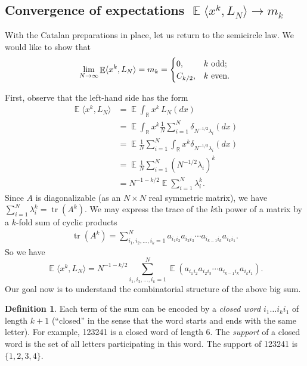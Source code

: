 \documentclass[letterpaper,11pt,oneside,reqno]{amsart}
\numberwithin{equation}{section}
\DeclareMathOperator{\EE}{\mathbb{E}}
\theoremstyle{definition}
\newtheorem{definition}[proposition]{Definition}
\begin{document}


\subsection{Convergence of expectations $\EE \langle x^k,L_N\rangle \to m_k$} %
\label{sub:convergence_of_expectations_}

With the Catalan preparations in place, let us return to the semicircle law. 
We would like to show that 
\begin{align}\label{desired_convergence_of_averages_in_WSCL}
	\lim_{N\to\infty}\EE \langle x^k,L_N\rangle = m_k=\begin{cases}
		0,&\textnormal{$k$ odd};\\
		C_{k/2},&\textnormal{$k$ even}.
	\end{cases}
\end{align}

First, observe that the left-hand side has the form
\begin{equation*}
\begin{split}
\EE\langle x^k,L_N\rangle&=\EE\int_{\mathbb R}x^k\,L_N(dx)\\
&=\EE\int_{\mathbb R}x^k\frac{1}{N}\sum_{i=1}^N \delta_{N^{-1/2}\lambda_i}(dx)\\
&=\EE\frac{1}{N}\sum_{i=1}^N\int_{\mathbb R}x^k\delta_{N^{-1/2}\lambda_i}(dx)\\
&=\EE\frac{1}{N}\sum_{i=1}^N (N^{-1/2}\lambda_i)^k\\
&= N^{-1-k/2}\EE \sum_{i=1}^N \lambda_i^k.
\end{split}
\end{equation*}
Since $A$ is diagonalizable (as an $N\times N$ real symmetric matrix), we have $\sum_{i=1}^N \lambda_i^k=\mathop{\mathrm{tr}}(A^k)$. We may express the trace of the $k$th power of a matrix by a $k$-fold sum of cyclic products 
\begin{align*}
	\mathop{\mathrm{tr}}(A^k)=\sum_{i_1,i_2,\ldots, i_k=1}^N a_{i_1i_2}a_{i_2i_3}\cdots a_{i_{k-1}i_k}a_{i_ki_1}.
\end{align*}
So we have
\begin{equation}\label{WSCL_proof_0}
	\EE\langle x^k,L_N\rangle
	=N^{-1-k/2} \sum_{i_1,i_2,\ldots, i_k=1}^N \EE (a_{i_1i_2}a_{i_2i_3}\cdots a_{i_{k-1}i_k}a_{i_ki_1}).
\end{equation}
Our goal now is to understand the combinatorial structure of the above big sum.
\begin{definition}
Each term of the sum can be encoded by a \emph{closed word}
$i_1\ldots i_ki_1$ of length $k+1$ (``closed'' in the sense that the word
starts and ends with the same letter). 
For example, 123241 is a closed word of length 6.
The \emph{support} of a closed word is the set of all letters participating in this word.
The support of 123241 is $\{1,2,3,4\}$.
\end{definition}
\end{document}
